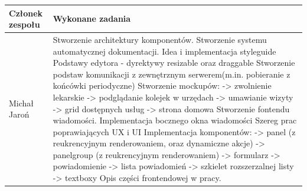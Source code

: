 \documentclass[licencjacka]{pracamgr}
\begin{document}
\begin{tabularx}{\linewidth}{|l|X|} \hline
	\textbf{Członek zespołu} & \textbf{Wykonane zadania} \\
	\hline
	Michał Jaroń & Stworzenie architektury komponentów. \newline
		    Stworzenie systemu automatycznej dokumentacji. \newline
		    Idea i implementacja styleguide\newline
		    Podstawy edytora - dyrektywy resizable oraz draggable\newline
		    Stworzenie podstaw komunikacji z zewnętrznym serwerem(m.in. pobieranie z końcówki periodyczne)\newline
           Stworzenie mockupów:\newline
			-> zwolnienie lekarskie\newline
			-> podglądanie kolejek w urzędach\newline
			-> umawianie wizyty\newline
			-> grid dostępnych usług\newline
			-> strona domowa \newline
		Stworzenie fontendu wiadomości. \newline
		Implementacja bocznego okna wiadomości\newline
		Szereg prac poprawiających UX i UI \newline
		Implementacja komponentów: \newline
		  -> panel (z reukrencyjnym renderowaniem, oraz dynamiczne akcje)\newline
		  -> panelgroup (z reukrencyjnym renderowaniem)\newline
		  -> formularz \newline
		  -> powiadomienie \newline
		  -> lista powiadomień \newline
		  -> szkielet rozszerzalnej listy \newline
		  -> textboxy \newline
		Opis części frontendowej w pracy.
	\\	
	

\end{tabularx}
\end{document}
